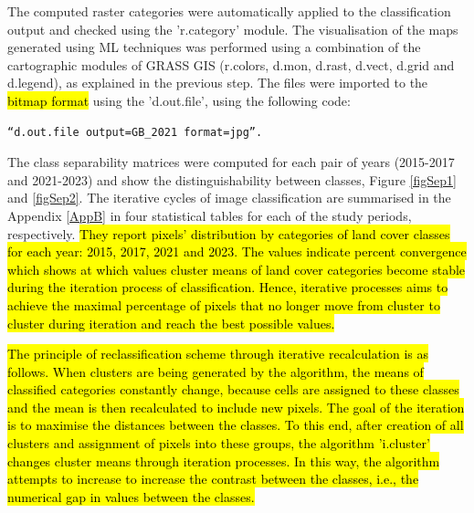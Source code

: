 \documentclass[jimaging,article,submit,pdftex,moreauthors]{Definitions/mdpi}
\begin{document}
The computed raster categories were automatically applied to the classification output and checked using the 'r.category' module. The visualisation of the maps generated using ML techniques was performed using a combination of the cartographic modules of GRASS GIS (r.colors, d.mon, d.rast, d.vect, d.grid and d.legend), as explained in the previous step. The files were imported to the \hl{bitmap format} using the 'd.out.file', using the following code:

 \begin{verbatim}
“d.out.file output=GB_2021 format=jpg”.
\end{verbatim}

The class separability matrices were computed for each pair of years (2015-2017 and 2021-2023) and show the distinguishability between classes, Figure \ref{figSep1} and \ref{figSep2}. The iterative cycles of image classification are summarised in the Appendix \ref{AppB} in four statistical tables for each of the study periods, respectively. \hl{They report pixels' distribution by categories of land cover classes for each year: 2015, 2017, 2021 and 2023. The values indicate percent convergence which shows at which values cluster means of land cover categories become stable during the iteration process of classification. Hence, iterative processes aims to achieve the maximal percentage of pixels that no longer move from cluster to cluster during iteration and reach the best possible values.} 

\hl{The principle of reclassification scheme through iterative recalculation is as follows. When clusters are being generated by the algorithm, the means of classified categories constantly change, because cells are assigned to these classes and the mean is then recalculated to include new pixels. The goal of the iteration is to maximise the distances between the classes.  To this end, after creation of all clusters and assignment of pixels into these groups, the algorithm 'i.cluster' changes cluster means through iteration processes. In this way, the algorithm attempts to increase to increase the contrast between the classes, i.e., the numerical gap in values between the classes.}
\end{document}
